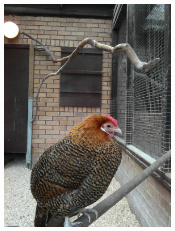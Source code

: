 \documentclass{l4proj}
\begin{document}
\begin{figure}[ht]
\begin{subfigure}[h!]{0.18\textwidth}
    \includegraphics[width=\textwidth, trim={0cm 6cm 0cm 6cm}, clip]{images/dataset/pretty_chicken/rgb.png}

\end{subfigure}
\end{figure}
\end{document}
